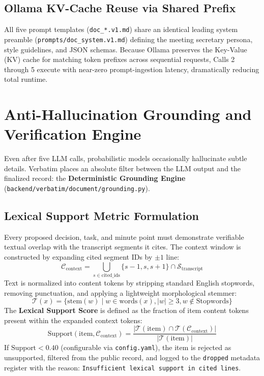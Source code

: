 \documentclass[10pt,a4paper]{article}
\begin{document}
\subsection{Ollama KV-Cache Reuse via Shared Prefix}
All five prompt templates (\texttt{doc\_*.v1.md}) share an identical leading system preamble (\texttt{prompts/doc\_system.v1.md}) defining the meeting secretary persona, style guidelines, and JSON schemas. Because Ollama preserves the Key-Value (KV) cache for matching token prefixes across sequential requests, Calls 2 through 5 execute with near-zero prompt-ingestion latency, dramatically reducing total runtime.

\section{Anti-Hallucination Grounding and Verification Engine}
\label{sec:grounding}

Even after five LLM calls, probabilistic models occasionally hallucinate subtle details. Verbatim places an absolute filter between the LLM output and the finalized record: the \textbf{Deterministic Grounding Engine} (\texttt{backend/verbatim/document/grounding.py}).

\subsection{Lexical Support Metric Formulation}
Every proposed decision, task, and minute point must demonstrate verifiable textual overlap with the transcript segments it cites. The context window is constructed by expanding cited segment IDs by $\pm 1$ line:
\begin{equation}
\mathcal{C}_{\text{context}} = \bigcup_{s \in \text{cited\_ids}} \{s - 1, s, s + 1\} \cap \mathcal{S}_{\text{transcript}}
\end{equation}
Text is normalized into content tokens by stripping standard English stopwords, removing punctuation, and applying a lightweight morphological stemmer:
\begin{equation}
\mathcal{T}(x) = \{\text{stem}(w) \mid w \in \text{words}(x), |w| \ge 3, w \notin \text{Stopwords}\}
\end{equation}
The \textbf{Lexical Support Score} is defined as the fraction of item content tokens present within the expanded context tokens:
\begin{equation}
\text{Support}(\text{item}, \mathcal{C}_{\text{context}}) = \frac{|\mathcal{T}(\text{item}) \cap \mathcal{T}(\mathcal{C}_{\text{context}})|}{|\mathcal{T}(\text{item})|}
\end{equation}
If $\text{Support} < 0.40$ (configurable via \texttt{config.yaml}), the item is rejected as unsupported, filtered from the public record, and logged to the \texttt{dropped} metadata register with the reason: \texttt{Insufficient lexical support in cited lines}.
\end{document}
